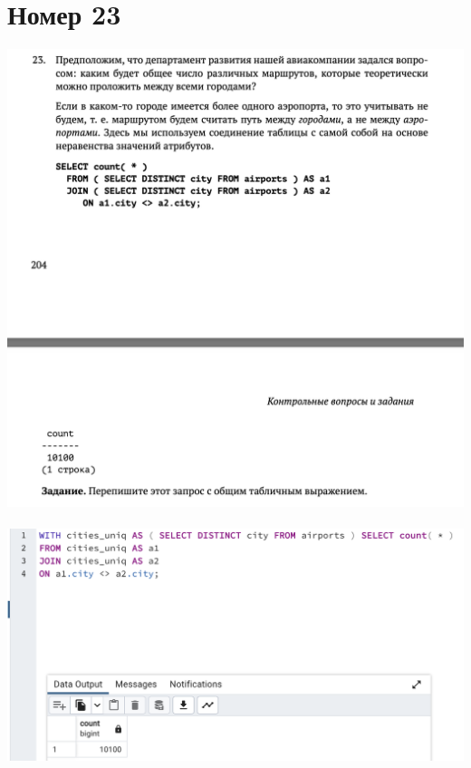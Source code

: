 \documentclass[a4paper,12pt]{article}
\begin{document}
\section*{Номер 23}
\includegraphics[scale=0.6]{t23.png}
\\\\
\includegraphics[scale=0.6]{23.png}
\end{document}
